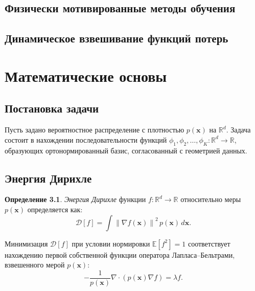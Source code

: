 \documentclass[14pt, a4paper, oneside]{extreport}
\theoremstyle{plain}
\theoremstyle{definition}
\newtheorem{definition}[theorem]{Определение}
\newcommand{\R}{\mathbb{R}}
\newcommand{\E}{\mathbb{E}}
\newcommand{\norm}[1]{\left\lVert #1 \right\rVert}
\begin{document}
\section{Физически мотивированные методы обучения}


\section{Динамическое взвешивание функций потерь}


\chapter{Математические основы}
\label{ch:math}

\section{Постановка задачи}

Пусть задано вероятностное распределение с плотностью $p(\mathbf{x})$ на $\R^d$.
Задача состоит в нахождении последовательности функций $\phi_1, \phi_2, \ldots, \phi_K : \R^d \to \R$, образующих ортонормированный базис, согласованный с геометрией данных.

\section{Энергия Дирихле}

\begin{definition}
\emph{Энергия Дирихле} функции $f : \R^d \to \R$ относительно меры $p(\mathbf{x})$ определяется как:
\begin{equation}
  \mathcal{D}[f] = \int \norm{\nabla f(\mathbf{x})}^2 \, p(\mathbf{x}) \, d\mathbf{x}.
\end{equation}
\end{definition}

Минимизация $\mathcal{D}[f]$ при условии нормировки $\E[f^2] = 1$ соответствует нахождению первой собственной функции оператора Лапласа--Бельтрами, взвешенного мерой $p(\mathbf{x})$:
\begin{equation}
  -\frac{1}{p(\mathbf{x})} \nabla \cdot (p(\mathbf{x}) \nabla f) = \lambda f.
\end{equation}
\end{document}
